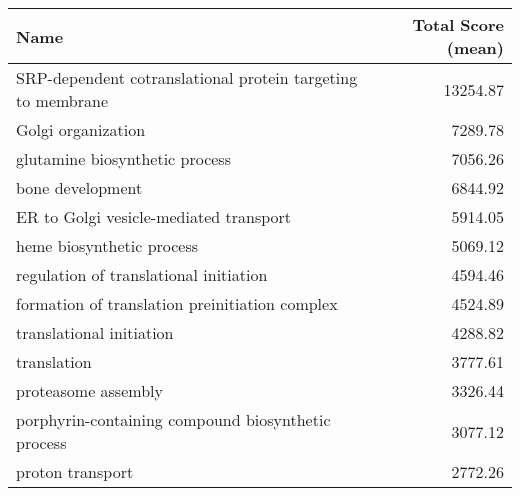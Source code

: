 \begin{table}[hp]
\begin{center} \sf
\begin{tabular}{p{}r}
\toprule
\textbf{Name}                                                 & \textbf{Total Score (mean)} \\ \midrule
SRP-dependent cotranslational protein targeting to membrane   & 13254.87                    \\ %
Golgi organization                                            & 7289.78                     \\ %
glutamine biosynthetic process                                & 7056.26                     \\
bone development                                              & 6844.92                     \\ %
ER to Golgi vesicle-mediated transport                        & 5914.05                     \\
heme biosynthetic process                                     & 5069.12                     \\ %
regulation of translational initiation                        & 4594.46                     \\ %
formation of translation preinitiation complex                & 4524.89                     \\ %
translational initiation                                      & 4288.82                     \\
translation                                                   & 3777.61                     \\
proteasome assembly                                           & 3326.44                     \\ %
porphyrin-containing compound biosynthetic process            & 3077.12                     \\ %
proton transport                                              & 2772.26                     \\ %

\end{tabular}
\end{center}
\end{table}
